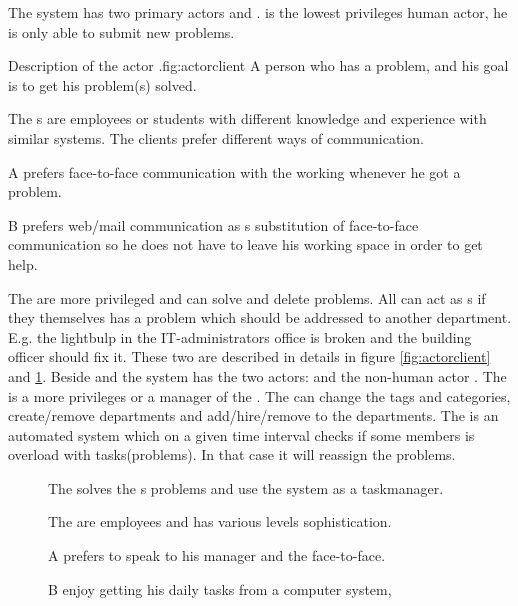 The system has two primary actors \aclient{} and \astaff. \aclient[c] is the lowest privileges human actor, he is only able to submit new problems. 

\begin{sadlist}[h]{\Aclient}{Description of the actor \aclient.}{fig:actorclient}
 A person who has a problem, and his goal is to get his problem(s) solved.

 The \aclient{}s are employees or students with different knowledge and experience with similar systems. The clients prefer different ways of communication.%

 \Aclient{} A prefers face-to-face communication with the working \astaff{} whenever he got a problem. 

\aclient[c] B prefers web/mail communication as s substitution of face-to-face communication so he does not have to leave his working space in order to get help. 

\end{sadlist}


The \astaff{} are more privileged and can solve and delete problems. 
All \astaff{} can act as \aclient{}s if they themselves has a problem which should be addressed to another department. 
E.g. the lightbulp in the IT-administrators office is broken and the building officer should fix it. 
These two are described in details in figure \ref{fig:actorclient} and \ref{fig:actorstaff}. 
Beside \astaff{} and \aclient{} the system has the two actors: \sadmin{} and the non-human actor \wmon. 
The \sadmin{} is a more privileges \astaff{} or a manager of the \astaff. 
The \sadmin{} can change the tags and categories, create/remove departments and add/hire/remove \astaff{} to the departments. 
The \wmon[] is an automated system which on a given time interval checks if some \astaff{} members is overload with tasks(problems). 
In that case it will reassign the problems.




\begin{figure}[h]

\begin{sadlistar}{\Astaff}

 The \astaff{} solves the \aclient[]s problems and use the system as a taskmanager.  

 The \astaff[] are employees and has various levels sophistication.

 \astaff[c] A prefers to speak to his manager and the \aclient[] face-to-face.

\astaff[c] B enjoy getting his daily tasks from a computer system, 
 \end{sadlistar}
 \caption{}
 \label{fig:actorstaff}
 \end{figure}
